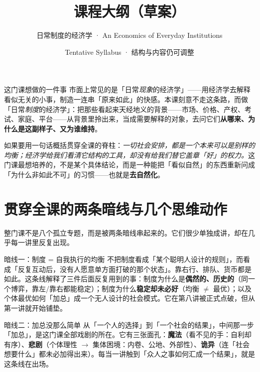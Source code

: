 \documentclass[10pt,a4paper]{ctexart}
\title{\vspace{-2em}\bfseries 课程大纲（草案）}
\author{日常制度的经济学 · An Economics of Everyday Institutions}
\date{Tentative Syllabus · 结构与内容仍可调整}
\begin{document}
\maketitle
\thispagestyle{fancy}

\begin{keybox}{这门课想做的一件事}
市面上常见的是「日常\emph{现象}的经济学」——用经济学去解释看似无关的小事，制造一连串「原来如此」的快感。本课刻意不走这条路，而做「日常\emph{制度}的经济学」：把那些看起来天经地义的背景——市场、价格、产权、考试、家庭、平台——从背景里拎出来，当成需要解释的对象，去问它们\textbf{从哪来、为什么是这副样子、又为谁维持}。

如果要用一句话概括贯穿全课的脊柱：\emph{一切社会安排，都是一个本来可以是别样的均衡；经济学给我们看清它结构的工具，却没有给我们替它盖章「好」的权力。}这门课最想培养的，不是某个具体结论，而是一种能把「看似自然」的东西重新问成「为什么非如此不可」的习惯——也就是\textbf{去自然化}。
\end{keybox}

\section{贯穿全课的两条暗线与几个思维动作}

整门课不是八个孤立专题，而是被两条暗线串起来的。它们很少单独成讲，却在几乎每一讲里反复出现。

\begin{conceptbox}{暗线一：制度 = 自我执行的均衡}
不把制度看成「某个聪明人设计的规则」，而看成「反复互动后，没有人愿意单方面打破的那个状态」。靠右行、排队、货币都是如此。这条线解释了三件后面反复用到的事：制度为什么是\textbf{偶然的、历史的}（同一个博弈，靠左/靠右都能稳定）；制度为什么\textbf{稳定却未必好}（均衡 $\neq$ 最优）；以及个体最优如何「加总」成一个无人设计的社会模式。它在第八讲被正式点破，但从第一讲就开始铺垫。
\end{conceptbox}

\begin{conceptbox}{暗线二：加总没那么简单}
从「一个人的选择」到「一个社会的结果」，中间那一步「加总」，是这门课全部戏剧的所在。它有三张面孔：\textbf{魔法}（看不见的手：自利却有序）、\textbf{悲剧}（个体理性 $\to$ 集体困境：内卷、公地、外部性）、\textbf{诡异}（连「社会想要什么」都未必加得出来）。每当一讲触到「众人之事如何汇成一个结果」，就是这条线在出场。
\end{conceptbox}
\end{document}

